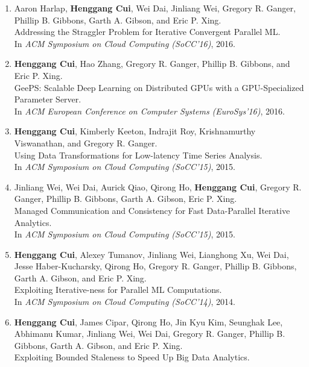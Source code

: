 \documentclass[10pt]{article}
\makeatletter
\newlength{\bibhang}
\newlength{\bibsep}
 {\@listi \global\bibsep\itemsep \global\advance\bibsep by\parsep}
\newenvironment{bibsection}%
        {\begin{enumerate}{}{%
       \setlength{\leftmargin}{\bibhang}%
       \setlength{\itemindent}{-\leftmargin}%
       \setlength{\itemsep}{\bibsep}%
       \setlength{\parsep}{\z@}%
        \setlength{\partopsep}{0pt}%
        \setlength{\topsep}{0pt}}}
        {\end{enumerate}\vspace{-.6\baselineskip}}
\makeatother
\begin{document}
\vspace{-.1275in}
\begin{bibsection}
    \item Aaron Harlap, {\bf Henggang Cui}, Wei Dai, Jinliang Wei,
        Gregory R. Ganger, Phillip B. Gibbons, Garth A. Gibson, and Eric P. Xing.\\
        Addressing the Straggler Problem for Iterative Convergent Parallel ML.\\
        In \emph{ACM Symposium on Cloud Computing (SoCC'16)},
        2016.
    \item {\bf Henggang Cui}, Hao Zhang, Gregory R. Ganger, Phillip B. Gibbons, and Eric P. Xing.\\
        GeePS: Scalable Deep Learning on Distributed GPUs with a GPU-Specialized Parameter Server.\\
        In \emph{ACM European Conference on Computer Systems (EuroSys'16)},
        2016.
    \item {\bf Henggang Cui}, Kimberly Keeton, Indrajit Roy, Krishnamurthy Viswanathan, and Gregory R. Ganger.\\
        Using Data Transformations for Low-latency Time Series Analysis.\\
        In \emph{ACM Symposium on Cloud Computing (SoCC'15)},
        2015.
    \item Jinliang Wei, Wei Dai, Aurick Qiao, Qirong Ho, {\bf Henggang Cui},
        Gregory R. Ganger, Phillip B. Gibbons, Garth A. Gibson, Eric P. Xing.\\
        Managed Communication and Consistency for Fast Data-Parallel Iterative Analytics.\\
        In \emph{ACM Symposium on Cloud Computing (SoCC'15)},
        2015.
    \item {\bf Henggang Cui}, Alexey Tumanov, Jinliang Wei, Lianghong Xu, Wei Dai,
        Jesse Haber-Kucharsky, Qirong Ho, Gregory R. Ganger, Phillip B. Gibbons, Garth A. Gibson, and Eric P. Xing.\\
        Exploiting Iterative-ness for Parallel ML Computations.\\
        In \emph{ACM Symposium on Cloud Computing (SoCC'14)},
        2014.
    \item {\bf Henggang Cui}, James Cipar, Qirong Ho, Jin Kyu Kim, Seunghak Lee, Abhimanu Kumar,
        Jinliang Wei, Wei Dai, Gregory R. Ganger, Phillip B. Gibbons, Garth A. Gibson, and Eric P. Xing.\\
        Exploiting Bounded Staleness to Speed Up Big Data Analytics.\\

\end{bibsection}
\end{document}
